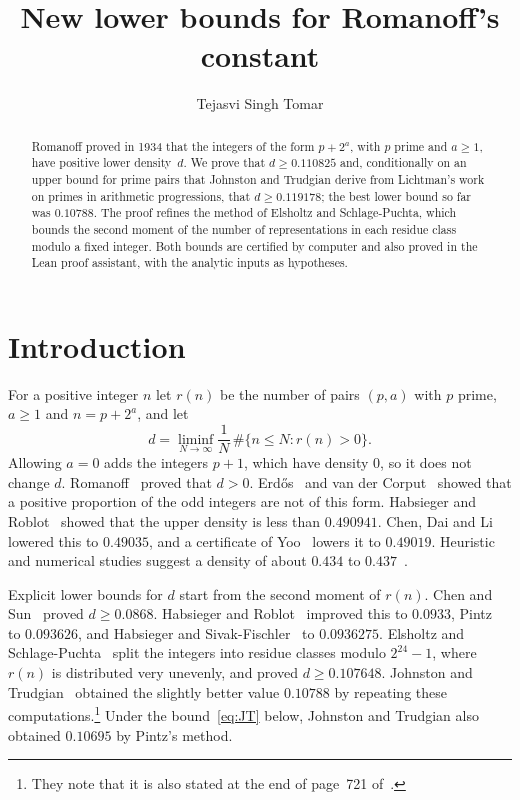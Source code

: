 \documentclass[11pt]{amsart}
\theoremstyle{definition}
\theoremstyle{remark}
\numberwithin{equation}{section}
\newcommand{\DmainG}{0.119178}%
\newcommand{\DcertG}{0.1191789096}
\newcommand{\DuncondG}{0.110825}%
\newcommand{\DuncondGcert}{0.1108257388}
\newcommand{\Duncond}{\DuncondG}\newcommand{\Duncondcert}{\DuncondGcert}
\newcommand{\Dmain}{\DmainG}\newcommand{\Dcert}{\DcertG}
\begin{document}
\title{New lower bounds for Romanoff's constant}
\author{Tejasvi Singh Tomar}
\renewcommand{\urladdrname}{{\itshape ORCID}}

\begin{abstract}
Romanoff proved in 1934 that the integers of the form $p+2^a$, with $p$ prime and $a\ge1$, have positive lower density~$d$. We prove that $d\ge\Duncond$ and, conditionally on an upper bound for prime pairs that Johnston and Trudgian derive from Lichtman's work on primes in arithmetic progressions, that $d\ge\Dmain$; the best lower bound so far was $0.10788$. The proof refines the method of Elsholtz and Schlage-Puchta, which bounds the second moment of the number of representations in each residue class modulo a fixed integer. Both bounds are certified by computer and also proved in the Lean proof assistant, with the analytic inputs as hypotheses.
\end{abstract}

\maketitle

\section{Introduction}\label{sec:intro}

For a positive integer $n$ let $r(n)$ be the number of pairs $(p,a)$ with $p$ prime, $a\ge1$ and $n=p+2^a$, and let
\[
d=\liminf_{N\to\infty}\frac1N\,\#\{n\le N:r(n)>0\}.
\]
Allowing $a=0$ adds the integers $p+1$, which have density $0$, so it does not change $d$. Romanoff~\cite{Rom34} proved that $d>0$. Erd\H{o}s~\cite{Erd50} and van der Corput~\cite{vdC50} showed that a positive proportion of the odd integers are not of this form. Habsieger and Roblot~\cite{HR06} showed that the upper density is less than $0.490941$. Chen, Dai and Li~\cite{CDL24} lowered this to $0.49035$, and a certificate of Yoo~\cite{Yoo26} lowers it to $0.49019$. Heuristic and numerical studies suggest a density of about $0.434$ to $0.437$~\cite{Rom83,DDDR20}.

Explicit lower bounds for $d$ start from the second moment of $r(n)$. Chen and Sun~\cite{CS04} proved $d\ge0.0868$. Habsieger and Roblot~\cite{HR06} improved this to $0.0933$, Pintz~\cite{Pin06} to $0.093626$, and Habsieger and Sivak-Fischler~\cite{HSF10} to $0.0936275$. Elsholtz and Schlage-Puchta~\cite{ESP18} split the integers into residue classes modulo $2^{24}-1$, where $r(n)$ is distributed very unevenly, and proved $d\ge0.107648$. Johnston and Trudgian~\cite[footnote~2]{JT26} obtained the slightly better value $0.10788$ by repeating these computations.\footnote{They note that it is also stated at the end of page~721 of~\cite{ESP18}.} Under the bound~\eqref{eq:JT} below, Johnston and Trudgian also obtained $0.10695$ by Pintz's method.
\end{document}
